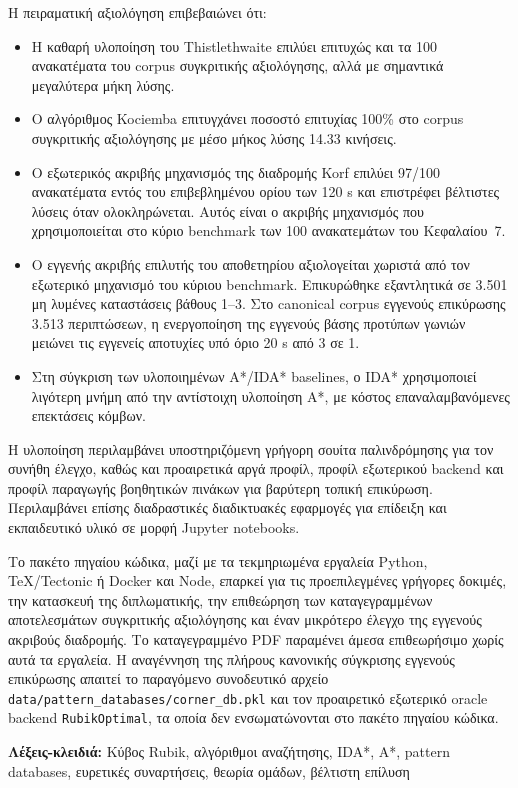 Η πειραματική αξιολόγηση επιβεβαιώνει ότι:
\begin{itemize}
    \item Η καθαρή υλοποίηση του Thistlethwaite επιλύει επιτυχώς και τα 100 ανακατέματα του corpus συγκριτικής αξιολόγησης, αλλά με σημαντικά μεγαλύτερα μήκη λύσης.
    \item Ο αλγόριθμος Kociemba επιτυγχάνει ποσοστό επιτυχίας 100\% στο corpus συγκριτικής αξιολόγησης με μέσο μήκος λύσης 14.33 κινήσεις.
    \item Ο εξωτερικός ακριβής μηχανισμός της διαδρομής Korf επιλύει 97/100 ανακατέματα εντός του επιβεβλημένου ορίου των 120 s και επιστρέφει βέλτιστες λύσεις όταν ολοκληρώνεται. Αυτός είναι ο ακριβής μηχανισμός που χρησιμοποιείται στο κύριο benchmark των 100 ανακατεμάτων του Κεφαλαίου~7.
    \item Ο εγγενής ακριβής επιλυτής του αποθετηρίου αξιολογείται χωριστά από τον εξωτερικό μηχανισμό του κύριου benchmark. Επικυρώθηκε εξαντλητικά σε 3.501 μη λυμένες καταστάσεις βάθους 1--3. Στο canonical corpus εγγενούς επικύρωσης 3.513 περιπτώσεων, η ενεργοποίηση της εγγενούς βάσης προτύπων γωνιών μειώνει τις εγγενείς αποτυχίες υπό όριο 20 s από 3 σε 1.
    \item Στη σύγκριση των υλοποιημένων A*/IDA* baselines, ο IDA* χρησιμοποιεί λιγότερη μνήμη από την αντίστοιχη υλοποίηση A*, με κόστος επαναλαμβανόμενες επεκτάσεις κόμβων.
\end{itemize}

Η υλοποίηση περιλαμβάνει υποστηριζόμενη γρήγορη σουίτα παλινδρόμησης για τον
συνήθη έλεγχο, καθώς και προαιρετικά αργά προφίλ, προφίλ εξωτερικού backend και
προφίλ παραγωγής βοηθητικών πινάκων για βαρύτερη τοπική επικύρωση. Περιλαμβάνει
επίσης διαδραστικές διαδικτυακές εφαρμογές για επίδειξη και εκπαιδευτικό υλικό
σε μορφή Jupyter notebooks.

Το πακέτο πηγαίου κώδικα, μαζί με τα τεκμηριωμένα εργαλεία Python,
TeX/Tectonic ή Docker και Node, επαρκεί για τις προεπιλεγμένες γρήγορες
δοκιμές, την κατασκευή της διπλωματικής, την επιθεώρηση των καταγεγραμμένων
αποτελεσμάτων συγκριτικής αξιολόγησης και έναν μικρότερο έλεγχο της εγγενούς
ακριβούς διαδρομής. Το καταγεγραμμένο PDF παραμένει άμεσα επιθεωρήσιμο χωρίς
αυτά τα εργαλεία. Η αναγέννηση της πλήρους κανονικής σύγκρισης εγγενούς
επικύρωσης απαιτεί το παραγόμενο συνοδευτικό αρχείο
\texttt{data/pattern\_databases/corner\_db.pkl} και τον προαιρετικό εξωτερικό
oracle backend \texttt{RubikOptimal}, τα οποία δεν ενσωματώνονται στο πακέτο
πηγαίου κώδικα.

\vspace{1cm}
\noindent\textbf{Λέξεις-κλειδιά:} Κύβος Rubik, αλγόριθμοι αναζήτησης, IDA*, A*, pattern databases, ευρετικές συναρτήσεις, θεωρία ομάδων, βέλτιστη επίλυση
